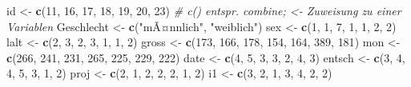 \documentclass[]{article}
\newenvironment{Shaded}{\begin{snugshade}}{\end{snugshade}}
\newcommand{\KeywordTok}[1]{\textcolor[rgb]{0.13,0.29,0.53}{\textbf{#1}}}
\newcommand{\DecValTok}[1]{\textcolor[rgb]{0.00,0.00,0.81}{#1}}
\newcommand{\StringTok}[1]{\textcolor[rgb]{0.31,0.60,0.02}{#1}}
\newcommand{\CommentTok}[1]{\textcolor[rgb]{0.56,0.35,0.01}{\textit{#1}}}
\newcommand{\NormalTok}[1]{#1}
\begin{document}
\begin{Shaded}
\begin{Highlighting}[]
\NormalTok{    id     <-}\StringTok{ }\KeywordTok{c}\NormalTok{(}\DecValTok{11}\NormalTok{, }\DecValTok{16}\NormalTok{, }\DecValTok{17}\NormalTok{, }\DecValTok{18}\NormalTok{, }\DecValTok{19}\NormalTok{, }\DecValTok{20}\NormalTok{, }\DecValTok{23}\NormalTok{) }\CommentTok{# c() entspr. combine; <- Zuweisung zu einer Variablen}
\NormalTok{    Geschlecht <-}\StringTok{ }\KeywordTok{c}\NormalTok{(}\StringTok{"mÃ¤nnlich"}\NormalTok{, }\StringTok{"weiblich"}\NormalTok{)}
\NormalTok{    sex    <-}\StringTok{ }\KeywordTok{c}\NormalTok{(}\DecValTok{1}\NormalTok{, }\DecValTok{1}\NormalTok{, }\DecValTok{7}\NormalTok{, }\DecValTok{1}\NormalTok{, }\DecValTok{1}\NormalTok{, }\DecValTok{2}\NormalTok{, }\DecValTok{2}\NormalTok{)}
\NormalTok{    lalt   <-}\StringTok{ }\KeywordTok{c}\NormalTok{(}\DecValTok{2}\NormalTok{, }\DecValTok{3}\NormalTok{, }\DecValTok{2}\NormalTok{, }\DecValTok{3}\NormalTok{, }\DecValTok{1}\NormalTok{, }\DecValTok{1}\NormalTok{, }\DecValTok{2}\NormalTok{)}
\NormalTok{    gross  <-}\StringTok{  }\KeywordTok{c}\NormalTok{(}\DecValTok{173}\NormalTok{, }\DecValTok{166}\NormalTok{, }\DecValTok{178}\NormalTok{, }\DecValTok{154}\NormalTok{, }\DecValTok{164}\NormalTok{, }\DecValTok{389}\NormalTok{, }\DecValTok{181}\NormalTok{)}
\NormalTok{    mon    <-}\StringTok{ }\KeywordTok{c}\NormalTok{(}\DecValTok{266}\NormalTok{, }\DecValTok{241}\NormalTok{, }\DecValTok{231}\NormalTok{, }\DecValTok{265}\NormalTok{, }\DecValTok{225}\NormalTok{, }\DecValTok{229}\NormalTok{, }\DecValTok{222}\NormalTok{)}
\NormalTok{    date   <-}\StringTok{ }\KeywordTok{c}\NormalTok{(}\DecValTok{4}\NormalTok{, }\DecValTok{5}\NormalTok{, }\DecValTok{3}\NormalTok{, }\DecValTok{3}\NormalTok{, }\DecValTok{2}\NormalTok{, }\DecValTok{4}\NormalTok{, }\DecValTok{3}\NormalTok{)}
\NormalTok{    entsch <-}\StringTok{ }\KeywordTok{c}\NormalTok{(}\DecValTok{3}\NormalTok{, }\DecValTok{4}\NormalTok{, }\DecValTok{4}\NormalTok{, }\DecValTok{5}\NormalTok{, }\DecValTok{3}\NormalTok{, }\DecValTok{1}\NormalTok{, }\DecValTok{2}\NormalTok{)}
\NormalTok{    proj   <-}\StringTok{ }\KeywordTok{c}\NormalTok{(}\DecValTok{2}\NormalTok{, }\DecValTok{1}\NormalTok{, }\DecValTok{2}\NormalTok{, }\DecValTok{2}\NormalTok{, }\DecValTok{2}\NormalTok{, }\DecValTok{1}\NormalTok{, }\DecValTok{2}\NormalTok{)}
\NormalTok{    i1     <-}\StringTok{ }\KeywordTok{c}\NormalTok{(}\DecValTok{3}\NormalTok{, }\DecValTok{2}\NormalTok{, }\DecValTok{1}\NormalTok{, }\DecValTok{3}\NormalTok{, }\DecValTok{4}\NormalTok{, }\DecValTok{2}\NormalTok{, }\DecValTok{2}\NormalTok{)}

\end{Highlighting}
\end{Shaded}
\end{document}
